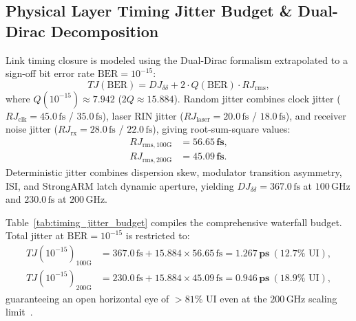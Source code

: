 \documentclass[journal]{IEEEtran}
\begin{document}
\subsection{Physical Layer Timing Jitter Budget \& Dual-Dirac Decomposition}
Link timing closure is modeled using the Dual-Dirac formalism extrapolated to a sign-off bit error rate $\text{BER} = 10^{-15}$:
\begin{equation}
    TJ(\text{BER}) = DJ_{\delta\delta} + 2 \cdot Q(\text{BER}) \cdot RJ_{\text{rms}},
\end{equation}
where $Q(10^{-15}) \approx 7.942$ ($2Q \approx 15.884$). Random jitter combines clock jitter ($RJ_{\text{clk}} = 45.0\,\text{fs}$ / $35.0\,\text{fs}$), laser RIN jitter ($RJ_{\text{laser}} = 20.0\,\text{fs}$ / $18.0\,\text{fs}$), and receiver noise jitter ($RJ_{\text{rx}} = 28.0\,\text{fs}$ / $22.0\,\text{fs}$), giving root-sum-square values:
\begin{align}
    RJ_{\text{rms}, 100\text{G}} &= \mathbf{56.65\,\text{fs}}, \\
    RJ_{\text{rms}, 200\text{G}} &= \mathbf{45.09\,\text{fs}}.
\end{align}
Deterministic jitter combines dispersion skew, modulator transition asymmetry, ISI, and StrongARM latch dynamic aperture, yielding $DJ_{\delta\delta} = 367.0\,\text{fs}$ at $100\,\text{GHz}$ and $230.0\,\text{fs}$ at $200\,\text{GHz}$.

Table~\ref{tab:timing_jitter_budget} compiles the comprehensive waterfall budget. Total jitter at $\text{BER} = 10^{-15}$ is restricted to:
\begin{align}
    TJ(10^{-15})_{100\text{G}} &= 367.0\,\text{fs} + 15.884 \times 56.65\,\text{fs} = \mathbf{1.267\,\text{ps}} \ (12.7\%\text{ UI}), \\
    TJ(10^{-15})_{200\text{G}} &= 230.0\,\text{fs} + 15.884 \times 45.09\,\text{fs} = \mathbf{0.946\,\text{ps}} \ (18.9\%\text{ UI}),
\end{align}
guaranteeing an open horizontal eye of $>81\%$ UI even at the $200\,\text{GHz}$ scaling limit~\cite{omi_sim_report}.
\end{document}

